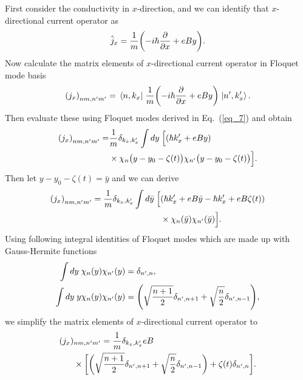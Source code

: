 First consider the conductivity in $x$-direction, and we can identify that $x$-directional current operator as
\begin{equation} \label{eq_d4}
  \hat{j}_x = \frac{1}{m} \qty(-i\hbar\pdv{x} + eBy).
\end{equation}
Now calculate the matrix elements of $x$-directional current operator in Floquet mode basis
\begin{equation} \label{eq_d5}
  \qty({j}_x)_{nm,n'm'} =
  \mel{n,k_x}{\;\frac{1}{m} \qty(-i\hbar\pdv{x} + eBy)\;}{n',k'_x}.
\end{equation}
Then evaluate these using Floquet modes derived in Eq.~(\ref{eq_7}) and obtain
\begin{equation} \label{eq_d6}
  \begin{aligned}
    \qty({j}_x)_{nm,n'm'} = &
    \frac{1}{{m}}
    \delta_{k_x,k'_x}
    \int dy \;
    \Big[
    \qty(\hbar k'_x + eBy) \\
    & \times
     \chi_{n}\big(y - y_0 - \zeta(t)\big)
    \chi_{n'}\big(y - y_0 - \zeta(t)\big)
    \Big].
  \end{aligned}
\end{equation}
Then let $y - y_0 - \zeta(t) = \bar{y}$ and we can derive
\begin{equation} \label{eq_d7}
  \begin{aligned}
    \qty({j}_x)_{nm,n'm'} =
    \frac{1}{{m}}
    \delta_{k_x,k'_x}
    \int d\bar{y} \;
    \Big[ &
    \qty(\hbar k'_x + eB\bar{y} -\hbar k'_x + eB\zeta(t)) \\
    & \times
    \chi_{n}(\bar{y})
    \chi_{n'}(\bar{y})
    \Big].
  \end{aligned}
\end{equation}
Using following integral identities of Floquet modes which are made up with  Gauss-Hermite functions \cite{vedenyapin11,szego59}
\begin{subequations} \label{eq_d8}
  \begin{align}
    \int d{y} \;
    \chi_{n}({y})
    \chi_{n'}({y}) &=
    \delta_{n',n}, \\
    \int dy \;
    y
    \chi_{n}({y})
    \chi_{n'}({y}) &=
    \qty(\sqrt{\frac{n+1}{2}} \delta_{n',n+1} + \sqrt{\frac{n}{2}}
    \delta_{n',n-1}),
  \end{align}
\end{subequations}
we simplify the matrix elements of $x$-directional current operator to
\begin{equation} \label{eq_d9}
  \begin{aligned}
    \qty({j}_x)&_{nm,n'm'} =
    \frac{1}{{m}}
    \delta_{k_x,k'_x}
    eB\\
    & \times
    \bigg[
    \bigg(\sqrt{\frac{n+1}{2}} \delta_{n',n+1} + \sqrt{\frac{n}{2}}
    \delta_{n',n-1}\bigg)
    + \zeta(t) \delta_{n',n}
    \bigg].
  \end{aligned}
\end{equation}

